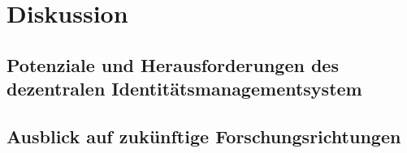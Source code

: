 \chapter{Diskussion}
\label{cha:diskussion}

\section{Potenziale und Herausforderungen des dezentralen Identitätsmanagementsystem}
\blindtext

\section{Ausblick auf zukünftige Forschungsrichtungen}
\blindtext

